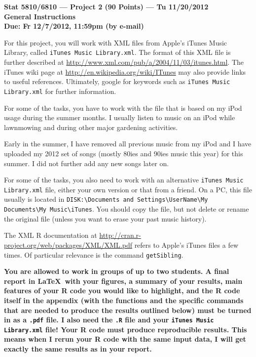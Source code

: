 \documentclass[11pt]{article}
\begin{document}
{\bf \Large
\noindent Stat 5810/6810 --- Project 2 (90 Points) --- Tu 11/20/2012 \\[0.1in]
General Instructions \\[0.1in]
Due: Fr 12/7/2012, 11:59pm (by e-mail)
}

\vspace{2em}

For this project, you will work with XML files from Apple's iTunes Music Library,
called {\tt iTunes Music Library.xml}. The format of this XML file is further described at
\url{http://www.xml.com/pub/a/2004/11/03/itunes.html}.
The iTunes wiki page at 
\url{http://en.wikipedia.org/wiki/ITunes}
may also provide links to useful references.
Ultimately, google for keywords such as
\verb|iTunes Music Library.xml| for further information.

For some of the tasks, you have to work with the file
that is based on my iPod usage during the summer months. I usually listen
to music on an iPod while lawnmowing and during other major gardening
activities. 

Early in the summer, I have removed all previous music from my iPod and
I have uploaded my 2012 set of songs (mostly 80ies and 90ies music this year)
for this summer. I did not further add any new songs later on.

For some of the tasks, you also need to work with an alternative {\tt iTunes Music Library.xml}
file, either your own version or that from a friend. On a PC, this file usually is located in
\verb|DISK:\Documents and Settings\UserName\My Documents\My Music\iTunes|.
You should copy the file, but not delete or rename the original file (unless you want
to erase your past music history).

The XML R documentation at 
\url{http://cran.r-project.org/web/packages/XML/XML.pdf}
refers to Apple's iTunes files a few times. Of particular relevance is the 
command {\tt getSibling}. 

{\bf You are allowed to work in groups of up to two students. A final report in \LaTeX\
with your figures, a summary of your results, main features of your R code you
would like to highlight,
and the R code itself in the appendix (with the functions and the specific commands that are
needed to produce the results outlined below)
must be turned in as a {\tt .pdf} file. I also need the {\tt .R} file and your {\tt iTunes Music Library.xml} file!
Your R code must produce reproducible results. This means when I rerun your R code with the
same input data, I will get exactly the same results as in your report.}
\end{document}

